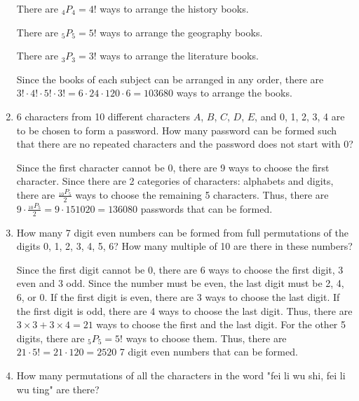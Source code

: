 \documentclass{report}
\newcommand\permtwo[2][^n]{{}_{#1}P_{#2}}
\begin{document}
\begin{multicols}{2}
\begin{enumerate}
          \sol{}

          There are $\permtwo[4]{4} = 4!$ ways to arrange the history books.

          There are $\permtwo[5]{5} = 5!$ ways to arrange the geography books.

          There are $\permtwo[3]{3} = 3!$ ways to arrange the literature books.

          Since the books of each subject can be arranged in any order, there are $3!
            \cdot 4! \cdot 5! \cdot 3! = 6 \cdot 24 \cdot 120 \cdot 6 = 103680$ ways to
          arrange the books.

    \item 6 characters from 10 different characters $A$, $B$, $C$, $D$, $E$, and 0, 1, 2, 3, 4 are to be chosen to form a password. How many password can be formed such that there are no repeated characters and the password does not start with 0?
          \sol{}

          Since the first character cannot be 0, there are 9 ways to choose the first
          character. Since there are 2 categories of characters: alphabets and digits,
          there are $\frac{\permtwo[10]{5}}{2}$ ways to choose the remaining 5
          characters. Thus, there are $9 \cdot \frac{\permtwo[10]{5}}{2} = 9 \cdot 151020
            = 136080$ passwords that can be formed.

    \item How many 7 digit even numbers can be formed from full permutations of the
          digits 0, 1, 2, 3, 4, 5, 6? How many multiple of 10 are there in these numbers?
          \sol{}

          Since the first digit cannot be 0, there are 6 ways to choose the first digit,
          3 even and 3 odd. Since the number must be even, the last digit must be 2, 4,
          6, or 0. If the first digit is even, there are 3 ways to choose the last digit.
          If the first digit is odd, there are 4 ways to choose the last digit. Thus,
          there are $3 \times 3 + 3 \times 4 = 21$ ways to choose the first and the last
          digit. For the other 5 digits, there are $\permtwo[5]{5} = 5!$ ways to choose
          them. Thus, there are $21 \cdot 5! = 21 \cdot 120 = 2520$ 7 digit even numbers that
          can be formed.

    \item How many permutations of all the characters in the word "fei li wu shi, fei li
          wu ting" are there?


\end{enumerate}
\end{multicols}
\end{document}
